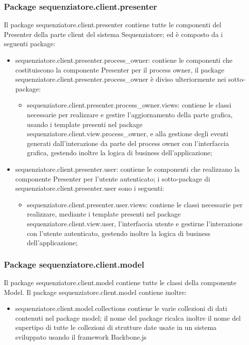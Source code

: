 \subsubsection{Package sequenziatore.client.presenter}
Il package sequenziatore.client.presenter contiene tutte le componenti del Presenter della parte client del sistema Sequenziatore; ed è composto da i seguenti package:
\begin{itemize}
	\item sequenziatore.client.presenter.process_owner: contiene le componenti che costituiscono la componente Presenter
per il process owner, il package sequenziatore.client.presenter.process_owner è diviso ulteriormente nei sotto-package:
	\begin{itemize}
		\item sequenziatore.client.presenter.process_owner.views: contiene le classi necessarie per realizzare e gestire l'aggiornamento della parte grafica, usando i template presenti nel package sequenziatore.client.view.process_owner, e alla gestione degli eventi generati dall'interazione da parte del process owner con l'interfaccia grafica, gestendo inoltre la logica di business dell'applicazione;
	\end{itemize}
	\item sequenziatore.client.presenter.user: contiene le componenti che realizzano la componente Presenter per l'utente autenticato; i sotto-package di sequenziatore.client.presenter.user sono i seguenti:
	\begin{itemize}
		\item sequenziatore.client.presenter.user.views: contiene le classi necessarie per realizzare, mediante i template presenti nel package sequenziatore.client.view.user, l'interfaccia utente e gestirne l'interazione con l'utente autenticato, gestendo inoltre la logica di business dell'applicazione;
	\end{itemize}
\end{itemize}
\subsubsection{Package sequenziatore.client.model}
Il package sequenziatore.client.model contiene tutte le classi della componente Model. 
Il package sequenziatore.client.model contiene inoltre:
\begin{itemize}
	\item sequenziatore.client.model.collections contiene le varie collezioni di dati contenuti nel package model; il nome del package ricalca inoltre il nome del supertipo di tutte le collezioni di strutture date usate in un sistema sviluppato usando il framework Backbone.js
\end{itemize}
